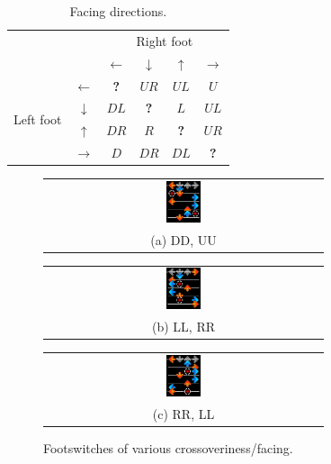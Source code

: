 \documentclass[10pt]{sigplanconf}
\begin{document}
\begin{table}[t]
	\begin{center}
	\begin{tabular}{cc|cccc}
		& & \multicolumn{4}{c}{Right foot} \\
		& & $\leftarrow$ & $\downarrow$ & $\uparrow$ & $\rightarrow$ \\
		\hline
		\multirow{4}{*}{Left foot}
		& $\leftarrow$  & \bf ? & $UR$ & $UL$ & $U$ \\
		& $\downarrow$  & $DL$ & \bf ? & $L$ & $UL$ \\
		& $\uparrow$    & $DR$ & $R$ & \bf ? & $UR$ \\
		& $\rightarrow$ & $D$ & $DR$ & $DL$ & \bf ? \\

	\end{tabular}
	\end{center}
	\caption{Facing directions.
	}
	\label{tab:facing}
\end{table}

\begin{figure}[t]
	\begin{tabular}{c}
	\includegraphics[width=0.13\textwidth]{fs-dd-uu.png} \\
	(a) DD, UU
	\end{tabular}
	\begin{tabular}{c}
	\includegraphics[width=0.13\textwidth]{fs-ll-rr.png} \\
	(b) LL, RR
	\end{tabular}
	\begin{tabular}{c}
	\includegraphics[width=0.13\textwidth]{fs-ll-rr-2.png} \\
	(c) RR, LL
	\end{tabular}
	\caption{Footswitches of various crossoveriness/facing.}
	\label{fig:fs}
\end{figure}
\end{document}
